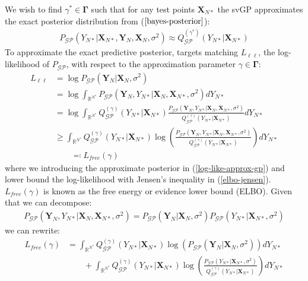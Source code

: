 \documentclass{article}
\newcommand{\GP}{\operatorname{\mathcal{GP}}}
\numberwithin{equation}{section}
\begin{document}
We wish to find $\gamma^* \in \mathbf{\Gamma}$ such that for any test points $\mathbf{X}_{N*}$ the svGP approximates the exact posterior distribution from ($\ref{bayes-posterior}$):
\begin{align}
    P_{\GP}\left(Y_{N*} \vert \mathbf{X}_{N*}, \mathbf{Y}_N, \mathbf{X}_N, \sigma^2 \right) \approx Q_{\GP}^{(\gamma^*)}\left(Y_{N*} \vert \mathbf{X}_{N*}\right)
    \label{svgp-desired-approximation}
\end{align}
To approximate the exact predictive posterior, \cite{titsias2009variational} targets matching $L_{\ell \ell}$, the log-likelihood of $P_{\GP}$, with respect to the approximation parameter $\gamma \in \boldsymbol{\Gamma}$:
\begin{align}
    L_{\ell \ell} &= \log P_{\GP}\left(\mathbf{Y}_N \vert \mathbf{X}_N, \sigma^2\right) \\ 
     \label{log-like}
    &= \log \int_{\mathbb{R}^{N^*}} P_{\GP}\left(\mathbf{Y}_N, Y_{N*} \vert \mathbf{X}_{N}, \mathbf{X}_{N*}, \sigma^2\right) d Y_{N*} \\
     \label{log-like-approx-gp}
&= \log \int_{\mathbb{R}^{N^*}} Q^{(\gamma)}_{\GP}\left(Y_{N*} \vert \mathbf{X}_{N*}\right) \frac{P_{\GP}\left(\mathbf{Y}_N, Y_{N*} \vert \mathbf{X}_{N}, \mathbf{X}_{N*}, \sigma^2\right)}{Q^{(\gamma)}_{\GP}\left(Y_{N*} \vert \mathbf{X}_{N*}\right)} d Y_{N*}\\
&\geq \int_{\mathbb{R}^{N^*}} Q^{(\gamma)}_{\GP}\left(Y_{N*} \vert \mathbf{X}_{N*}\right) \log\left(\frac{P_{\GP}\left(\mathbf{Y}_N, Y_{N*} \vert \mathbf{X}_{N}, \mathbf{X}_{N*}, \sigma^2\right)}{Q^{(\gamma)}_{\GP}\left(Y_{N*} \vert \mathbf{X}_{N*}\right)} \right)d Y_{N*}
 \label{elbo-jensen}
 \\ & \qquad \eqqcolon L_{free}(\gamma)
 \label{elbo-definition}
\end{align}
where we introducing the approximate posterior in (\ref{log-like-approx-gp}) and lower bound the log-likelihood with Jensen's inequality in (\ref{elbo-jensen}). $L_{free}(\gamma)$ is known as the free energy or evidence lower bound (ELBO). Given that we can decompose:
\begin{align}
    P_{\GP}\left(\mathbf{Y}_N, Y_{N*} \vert \mathbf{X}_{N}, \mathbf{X}_{N*}, \sigma^2\right) = P_{\GP} \left(\mathbf{Y}_N \vert \mathbf{X}_{N}, \sigma^2\right) P_{\GP}\left(Y_{N*}\vert \mathbf{X}_{N*}, \sigma^2 \right)
    \label{decomposed-numerator}
\end{align}
we can rewrite:
\begin{align}
    L_{free}(\gamma) &= \int_{\mathbb{R}^{N^*}} Q^{(\gamma)}_{\GP}(Y_{N*} \vert \mathbf{X}_{N*}) \log \left(P_{\GP}\left(\mathbf{Y}_N \vert \mathbf{X}_{N}, \sigma^2\right)\right) d Y_{N*} \nonumber
    \\ & \qquad + \int_{\mathbb{R}^{N^*}} Q^{(\gamma)}_{\GP}(Y_{N*} \vert \mathbf{X}_{N*}) \log \left(\frac{P_{\GP}\left( Y_{N*} \vert \mathbf{X}_{N*}, \sigma^2\right) }{Q^{(\gamma)}_{\GP}\left(Y_{N*} \vert \mathbf{X}_{N*}\right)}\right) d Y_{N*}
    \label{elbo-broken-down}
\end{align}
\end{document}
